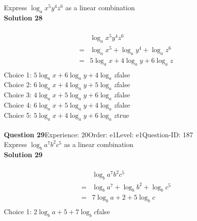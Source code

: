 \documentclass{article}
\begin{document}
Express $\log_{a}x^5y^4z^6$ as a linear combination\\[4pt]
\noindent\textbf{Solution 28}\\[2pt]
\\[-35pt]\begin{align*}
&\log_{a}x^5y^4z^6\\[2pt]
=&\log_{a}x^5+\log_{a}y^4+\log_{a}z^6\\[2pt]
=&5\log_{a}x+4\log_{a}y+6\log_{a}z\\[-30pt]
\end{align*}
Choice 1: \hspace{20pt}$5\log_{a}x+6\log_{a}y+4\log_{a}z$\hspace{20pt}false\\
Choice 2: \hspace{20pt}$6\log_{a}x+4\log_{a}y+5\log_{a}z$\hspace{20pt}false\\
Choice 3: \hspace{20pt}$4\log_{a}x+5\log_{a}y+6\log_{a}z$\hspace{20pt}false\\
Choice 4: \hspace{20pt}$6\log_{a}x+5\log_{a}y+4\log_{a}z$\hspace{20pt}false\\
Choice 5: \hspace{20pt}$5\log_{a}x+4\log_{a}y+6\log_{a}z$\hspace{20pt}true\\
\\[4pt]
\noindent\textbf{Question 29}\hspace{20pt}Experience: 20\hspace{20pt}Order: e1\hspace{20pt}Level: e1\hspace{20pt}Question-ID: 187\\[2pt]
Express $\log_{b}a^7b^2c^5$ as a linear combination\\[4pt]
\noindent\textbf{Solution 29}\\[2pt]
\\[-35pt]\begin{align*}
&\log_{b}a^7b^2c^5\\[2pt]
=&\log_{b}a^7+\log_{b}b^2+\log_{b}c^5\\[2pt]
=&7\log_{b}a+2+5\log_{b}c\\[-30pt]
\end{align*}
Choice 1: \hspace{20pt}$2\log_{b}a+5+7\log_{b}c$\hspace{20pt}false\\
\end{document}
